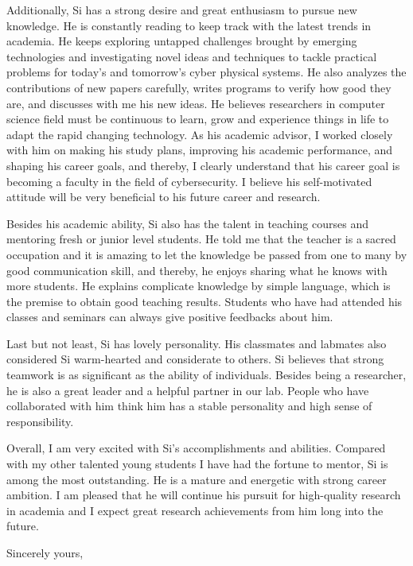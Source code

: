 \documentclass[12pt]{letter} %
\begin{document}
\begin{letter}{}
Additionally, Si has a strong desire and great enthusiasm to pursue new knowledge. He is constantly reading to keep track with the latest trends in academia. He keeps exploring untapped challenges brought by emerging technologies and investigating novel ideas and techniques to tackle practical problems for today's and tomorrow's cyber physical systems. He also analyzes the contributions of new papers carefully, writes programs to verify how good they are, and discusses with me his new ideas. He believes researchers in computer science field must be continuous to learn, grow and experience things in life to adapt the rapid changing technology. As his academic advisor, I worked closely with him on making his study plans, improving his academic performance, and shaping his career goals, and thereby, I clearly understand that his career goal is becoming a faculty in the field of cybersecurity. I believe his self-motivated attitude will be very beneficial to his future career and research.

Besides his academic ability, Si also has the talent in teaching courses and mentoring fresh or junior level students. He told me that the teacher is a sacred occupation and it is amazing to let the knowledge be passed from one to many by good communication skill, and thereby, he enjoys sharing what he knows with more students. He explains complicate knowledge by simple language, which is the premise to obtain good teaching results. Students who have had attended his classes and seminars can always give positive feedbacks about him.

Last but not least, Si has lovely personality. His classmates and labmates also considered Si warm-hearted and considerate to others. Si believes that strong teamwork is as significant as the ability of individuals. Besides being a researcher, he is also a great leader and a helpful partner in our lab. People who have collaborated with him think him has a stable personality and high sense of responsibility. 

Overall, I am very excited with Si's accomplishments and abilities. Compared with my other talented young students I have had the fortune to mentor, Si is among the most outstanding. He is a mature and energetic with strong career ambition. I am pleased that he will continue his pursuit for high-quality research in academia and I expect great research achievements from him long into the future. 






\closing{Sincerely yours,}




\end{letter}
\end{document}
